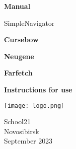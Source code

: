 \begin{titlepage}
    \begin{center}
      \vspace*{1cm}
  
      \Huge
      \textbf{Manual}
  
      \vspace{0.5cm}
      \LARGE
      SimpleNavigator
      \vspace{0.8cm}
  
      \textbf{Cursebow}

      \vspace{0.5cm}
      
      \textbf{Neugene}

      \vspace{0.5cm}
      
      \textbf{Farfetch}
  
      \vspace{2cm}
      \textbf{Instructions for use}
  
      \vspace{0.5cm}
  
      \texttt{[image: logo.png]}
  
      \vspace{5cm}
      \LARGE
      School21\\
      \small
      Novosibirsk\\
      September 2023\\
    \end{center}
  \end{titlepage}
  